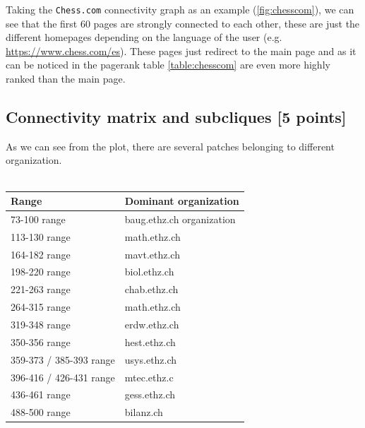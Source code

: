 \documentclass[unicode,11pt,a4paper,oneside,numbers=endperiod,openany]{scrartcl}
\begin{document}
Taking the \texttt{Chess.com} connectivity graph as an example (\ref{fig:chesscom}), we can see that the first 60 pages are strongly connected to each other, 
these are just the different homepages depending on the language of the user (e.g. \url{https://www.chess.com/es}). 
These pages just redirect to the main page and as it can be noticed in the pagerank table \ref{table:chesscom} are even more highly ranked than the main page.


\subsection{Connectivity matrix and subcliques [5 points]}
As we can see from the plot, there are several patches belonging to different organization.
\\ \\
\begin{tabular}{|l|l|}
\hline
\textbf{Range} & \textbf{Dominant organization} \\
\hline
73-100 range & baug.ethz.ch organization\\
113-130 range & math.ethz.ch\\
164-182 range & mavt.ethz.ch\\
198-220 range & biol.ethz.ch\\
221-263 range & chab.ethz.ch\\
264-315 range & math.ethz.ch\\
319-348 range & erdw.ethz.ch\\
350-356 range & hest.ethz.ch\\
359-373 / 385-393 range & usys.ethz.ch\\
396-416 / 426-431 range  & mtec.ethz.c\\
436-461 range & gess.ethz.ch\\
488-500 range & bilanz.ch \\
\hline
\end{tabular}
\end{document}
